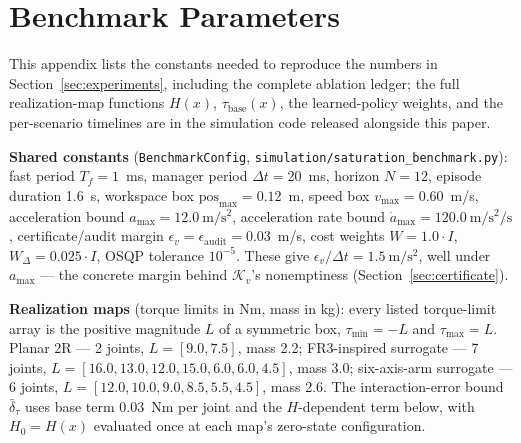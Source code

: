 \documentclass[journal]{IEEEtran}
\begin{document}
\appendices
\section{Benchmark Parameters}
\label{app:params}

This appendix lists the constants needed to reproduce the numbers in Section~\ref{sec:experiments}, including the complete ablation ledger; the full realization-map functions $H(x)$, $\tau_{\mathrm{base}}(x)$, the learned-policy weights, and the per-scenario timelines are in the simulation code released alongside this paper.

\textbf{Shared constants} (\texttt{BenchmarkConfig}, \texttt{simulation/saturation\_benchmark.py}): fast period $T_f=1$~ms, manager period $\Delta t=20$~ms, horizon $N=12$, episode duration 1.6~s, workspace box $\mathrm{pos}_{\max}=0.12$~m, speed box $v_{\max}=0.60$~m/s, acceleration bound $a_{\max}=12.0~\mathrm{m/s^2}$, acceleration rate bound $\dot a_{\max}=120.0~\mathrm{m/s^2/s}$, certificate/audit margin $\epsilon_v=\epsilon_{\mathrm{audit}}=0.03$~m/s, cost weights $W=1.0\cdot I$, $W_\Delta=0.025\cdot I$, OSQP tolerance $10^{-5}$. These give $\epsilon_v/\Delta t=1.5~\mathrm{m/s^2}$, well under $a_{\max}$ --- the concrete margin behind $\mathcal K_v$'s nonemptiness (Section~\ref{sec:certificate}).

\textbf{Realization maps} (torque limits in Nm, mass in kg): every listed torque-limit array is the positive magnitude $L$ of a symmetric box, $\tau_{\min}=-L$ and $\tau_{\max}=L$. Planar 2R --- 2 joints, $L=[9.0,7.5]$, mass 2.2; FR3-inspired surrogate --- 7 joints, $L=[16.0,13.0,12.0,15.0,6.0,6.0,4.5]$, mass 3.0; six-axis-arm surrogate --- 6 joints, $L=[12.0,10.0,9.0,8.5,5.5,4.5]$, mass 2.6. The interaction-error bound $\bar\delta_\tau$ uses base term 0.03~Nm per joint and the $H$-dependent term below, with $H_0=H(x)$ evaluated once at each map's zero-state configuration.
\end{document}
